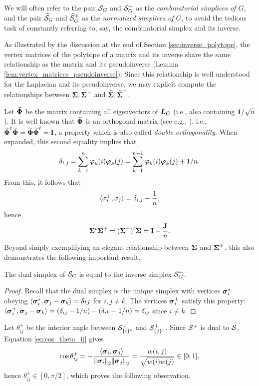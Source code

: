 We will often refer to the pair $\mathcal{S}_G$ and $\mathcal{S}_G^+$ as the \emph{combinatorial simplices of $G$}, and the pair $\widehat{\mathcal{S}}_G$ and $\widehat{\mathcal{S}}_G^+$ as the \emph{normalized simplices of $G$}, to avoid the tedious task of constantly referring to, say, the combinatorial simplex and its inverse. 

As illustrated by the discussion at the end of Section \ref{sec:inverse_polytope}, the vertex matrices of the polytope of a matrix and its inverse share the same relationship as the matrix and its pseudoinverse (Lemma \ref{lem:vertex_matrices_pseudoinverse}). Since this relationship is well understood for the Laplacian and its pseudoinverse, we may explicit compute the relationships between $\boldsymbol{\Sigma},\boldsymbol{\Sigma}^+$ and $\widehat{\boldsymbol{\Sigma}},\widehat{\boldsymbol{\Sigma}}^+$. 

Let $\widetilde{\boldsymbol{\Phi}}$ be the matrix containing all eigenvectors of $\vb*{L}_G$ (i.e., also containing $\vb{1}/\sqrt{n}$).  It is well known that $\widetilde{\boldsymbol{\Phi}}$ is an orthogonal matrix (see e.g., \cite{van2013double}), i.e., $\widetilde{\boldsymbol{\Phi}}^t \widetilde{\boldsymbol{\Phi}}=\widetilde{\boldsymbol{\Phi}}\widetilde{\boldsymbol{\Phi}}^t=\vb{I}$, a property which is also called \emph{double orthogonality}. When expanded, this second equality implies that
\begin{equation}
\label{eq:sum_double_ortho}
\delta_{i,j}=\sum_{k=1}^n \vb*{\varphi}_k(i)\vb*{\varphi}_k(j) = \sum_{k=1}^{n-1} \vb*{\varphi}_k(i)\vb*{\varphi}_k(j) + 1/n.
\end{equation}
From this, it follows that 
\[\langle\sigma_i^+,\sigma_j\rangle = \delta_{i,j} - \frac{1}{n},\]
hence, 
\begin{equation}
\label{eq:sv+sv}
    \boldsymbol{\Sigma}^t\boldsymbol{\Sigma}^+=(\boldsymbol{\Sigma}^+)^t\boldsymbol{\Sigma}=\vb{I}-\frac{\vb{J}}{n}.
\end{equation}
Beyond simply exemplifying an elegant relationship between $\boldsymbol{\Sigma}$ and $\boldsymbol{\Sigma}^+$, this also demonstrates the following important result. 

\begin{observation}
	\label{obs:inverse_is_dual}
	The dual simplex of $\mathcal{S}_G$ is equal to the inverse simplex $\mathcal{S}_G^+$. 
\end{observation}
\begin{proof}
	Recall that the dual simplex is the unique simplex with vertices $\vb*{\sigma}_i^*$ obeying $\langle \vb*{\sigma}_i^*,\vb*{\sigma}_j-\vb*{\sigma}_k\rangle = \delta{ij}$ for $i,j\neq k$. The vertices $\vb*{\sigma}_i^+$ satisfy this property: $\langle \vb*{\sigma}_i^+,\vb*{\sigma}_j-\vb*{\sigma}_k\rangle = (\delta_{ij}-1/n) - (\delta_{ik} - 1/n) = \delta_{ij}$ since $i\neq k$. 
\end{proof}
Let $\theta^+_{ij}$ be the interior angle between $\mathcal{S}^+_{\{i\}^c}$ and $\mathcal{S}^+_{\{j\}^c}$. Since $\mathcal{S}^+$ is dual to $\mathcal{S}$, Equation \ref{eq:cos_theta_ij} gives 
\[\cos\theta_{ij}^+ = - \frac{\langle \vb*{\sigma}_i,\vb*{\sigma}_j\rangle}{\norm{\vb*{\sigma}_i}_2\norm{\vb*{\sigma}_j}_2} = \frac{w(i,j)}{\sqrt{w(i)w(j)}}\in[0,1],\]
hence $\theta^+_{ij}\in[0,\pi/2]$, which proves the following observation. 

